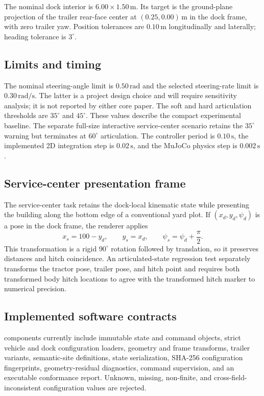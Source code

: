 The nominal dock interior is $6.00\times1.50\,\mathrm{m}$. Its target is the
ground-plane projection of the trailer rear-face center at
$(0.25,0.00)\,\mathrm{m}$ in the dock frame, with zero trailer yaw. Position
tolerances are $0.10\,\mathrm{m}$ longitudinally and laterally; heading
tolerance is $3^\circ$.

\subsection{Limits and timing}

The nominal steering-angle limit is $0.50\,\mathrm{rad}$ and the selected
steering-rate limit is $0.30\,\mathrm{rad/s}$. The latter is a project design
choice and will require sensitivity analysis; it is not reported by either core
paper. The soft and hard articulation thresholds are $35^\circ$ and $45^\circ$.
These values describe the compact experimental baseline. The separate
full-size interactive service-center scenario retains the $35^\circ$ warning
but terminates at $60^\circ$ articulation.
The controller period is $0.10\,\mathrm{s}$, the implemented 2D integration step is
$0.02\,\mathrm{s}$, and the MuJoCo physics step is $0.002\,\mathrm{s}$.

\subsection{Service-center presentation frame}

The service-center task retains the dock-local kinematic state while presenting
the building along the bottom edge of a conventional yard plot. If
$(x_d,y_d,\psi_d)$ is a pose in the dock frame, the renderer applies
\begin{equation}
  x_s=100-y_d,\qquad y_s=x_d,\qquad
  \psi_s=\psi_d+\frac{\pi}{2}.
\end{equation}
This transformation is a rigid $90^\circ$ rotation followed by translation,
so it preserves distances and hitch coincidence. An articulated-state
regression test separately transforms the tractor pose, trailer pose, and hitch
point and requires both transformed body hitch locations to agree with the
transformed hitch marker to numerical precision.

\subsection{Implemented software contracts}

\implemented{} components currently include immutable state and command
objects, strict vehicle and dock configuration loaders, geometry and frame
transforms, trailer variants, semantic-site definitions, state serialization,
SHA-256 configuration fingerprints, geometry-residual diagnostics, command
supervision, and an executable conformance report. Unknown, missing,
non-finite, and cross-field-inconsistent configuration values are rejected.

